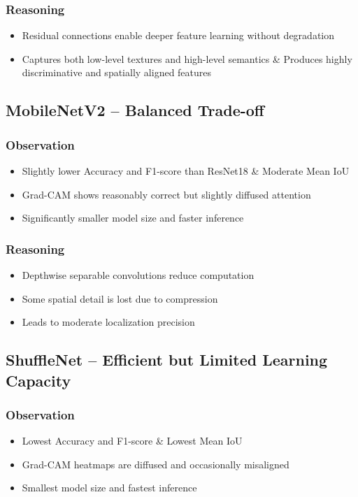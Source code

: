\subsubsection{Reasoning}
\begin{itemize}

\item Residual connections enable deeper feature learning without degradation
\item Captures both low-level textures and high-level semantics \&
Produces highly discriminative and spatially aligned features
\end{itemize}

\subsection{MobileNetV2 – Balanced Trade-off}
\subsubsection{Observation}
\begin{itemize}
\item Slightly lower Accuracy and F1-score than ResNet18 \&
Moderate Mean IoU
\item Grad-CAM shows reasonably correct but slightly diffused attention
\item Significantly smaller model size and faster inference
\end{itemize}


\subsubsection{Reasoning}
\begin{itemize}

\item Depthwise separable convolutions reduce computation
\item Some spatial detail is lost due to compression
\item Leads to moderate localization precision
\end{itemize}

\subsection{ShuffleNet – Efficient but Limited Learning Capacity}
\subsubsection{Observation}
\begin{itemize}
\item Lowest Accuracy and F1-score \& Lowest Mean IoU
\item Grad-CAM heatmaps are diffused and occasionally misaligned
\item Smallest model size and fastest inference
\end{itemize}


